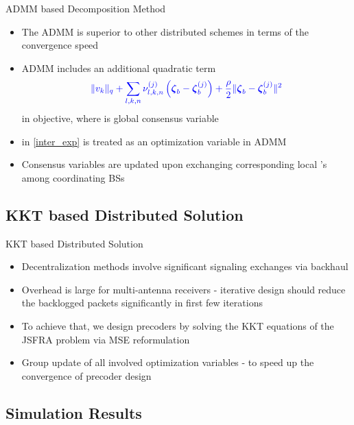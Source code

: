 \documentclass[9pt]{beamer}
\begin{document}
\begin{frame}{ADMM based Decomposition Method}
	\begin{itemize}
		\item The \ac{ADMM} is superior to other distributed schemes in terms of the convergence speed
		\item \ac{ADMM} includes an additional quadratic term 
		\begin{equation}
		\color{blue} \|v_k\|_q + \sum_{l,k,n} \nu_{l,k,n}^{(j)} \left ( {\boldsymbol{\zeta}}_b - {\boldsymbol{\zeta}}^{(j)}_b \right ) + \frac{\rho}{2}  \| {\boldsymbol{\zeta}}_b - {\boldsymbol{\zeta}}^{(j)}_b \|^2
		\end{equation}
		in objective, where  is global consensus variable
		\item {} in \eqref{inter_exp} is \alert{treated as an optimization variable in \ac{ADMM}}
		\item Consensus variables are updated upon exchanging corresponding local 's among coordinating \acp{BS}
	\end{itemize}
\end{frame}

\subsection{KKT based Distributed Solution}

\begin{frame}{KKT based Distributed Solution}
	\begin{itemize}
		\item Decentralization methods involve significant signaling exchanges via backhaul
		\item \alert{Overhead is large for multi-antenna receivers} - iterative design should reduce the backlogged packets significantly in first few iterations
		\item To achieve that, we design precoders by solving the \ac{KKT} equations of the \acs{JSFRA} problem via \acs{MSE} reformulation
		\item \alert{Group update of all involved optimization variables} - to speed up the convergence of precoder design
	\end{itemize}
\end{frame}

\subsection{Simulation Results}
\end{document}
